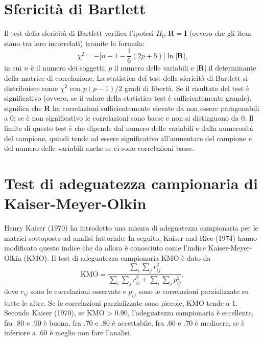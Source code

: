 \section{Sfericità di Bartlett}

Il test della sfericità di Bartlett verifica l’ipotesi $H_0 : \boldsymbol{R} = \boldsymbol{I}$ (ovvero che gli item siano tra loro incorrelati) tramite
la formula:
\begin{equation}
\chi^2 = -\bigg[n -1 -\frac{1}{6} (2p +5)\bigg] \ln |\boldsymbol{R}|,
\end{equation}
in cui $n$ è il numero dei soggetti, $p$ il numero delle variabili e $|\boldsymbol{R}|$ il determinante della matrice di correlazione. La statistica del test della sfericità di Bartlett si distribuisce come $\chi^2$ con $p(p - 1)/2$ gradi di libertà. Se il risultato del test è significativo (ovvero, se il valore della statistica test è sufficientemente grande), significa che $\boldsymbol{R}$ ha correlazioni sufficientemente elevate da non essere paragonabili a 0; se è non significativo le correlazioni sono basse e non si distinguono da 0. 
Il limite di questo test è che dipende dal numero delle variabili e dalla
numerosità del campione, quindi tende ad essere significativo
all'aumentare del campione e del numero delle variabili anche se
ci sono correlazioni basse.


\section{Test di adeguatezza campionaria di Kaiser-Meyer-Olkin}

Henry Kaiser (1970) ha introdotto una misura di adeguatezza campionaria per le matrici sottoposte ad analisi fattoriale. In seguito, Kaiser and Rice (1974) hanno modificato questo indice che da allora è conosciuto come l'indice Kaiser-Meyer-Olkin (KMO). Il test di adeguatezza campionaria KMO è dato da
\begin{equation}
\text{KMO} = \frac{\sum_i\sum_j r^2_{ij}}{\sum_i\sum_j r^2_{ij} +\sum_i\sum_jp^2_{ij}},
\end{equation}
dove $r_{ij}$ sono le correlazioni osservate e $p_{ij}$ sono le correlazioni
parzializzate su tutte le altre. Se le correlazioni parzializzate sono piccole, KMO tende a 1. Secondo Kaiser (1970), se KMO > 0.90, l'adeguatezza campionaria è eccellente, fra .80 e .90 è buona, fra .70 e .80 è accettabile, fra .60 e .70 è mediocre, se è
inferiore a .60 è meglio non fare l'analisi.

